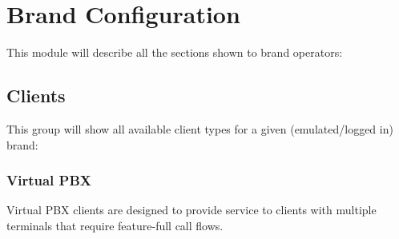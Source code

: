 \documentclass[letterpaper,10pt,spanish]{sphinxmanual}
\begin{document}
\chapter{Brand Configuration}
\label{administration_portal/brand/index::doc}\label{administration_portal/brand/index:brand-configuration}
This module will describe all the sections shown to brand operators:


\section{Clients}
\label{administration_portal/brand/clients/index:clients}\label{administration_portal/brand/clients/index::doc}
This group will show all available client types for a given (emulated/logged in) brand:


\subsection{Virtual PBX}
\label{administration_portal/brand/clients/virtual_pbx:id1}\label{administration_portal/brand/clients/virtual_pbx::doc}\label{administration_portal/brand/clients/virtual_pbx:virtual-pbx}
Virtual PBX clients are designed to provide service to clients with multiple terminals
that require feature-full call flows.
\end{document}
